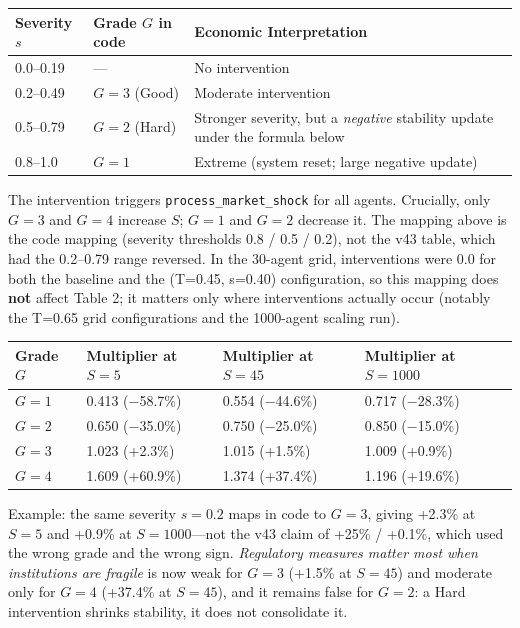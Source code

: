 \documentclass[11pt]{article}
\begin{document}
\begin{table}[htbp]
\centering
\begin{tabular}{lll}
\toprule
\textbf{Severity $s$} & \textbf{Grade $G$ in code} & \textbf{Economic Interpretation} \\
\midrule
0.0--0.19 & --- & No intervention \\
0.2--0.49 & $G=3$ (Good) & Moderate intervention \\
0.5--0.79 & $G=2$ (Hard) & Stronger severity, but a \textit{negative} stability update under the formula below \\
0.8--1.0 & $G=1$ & Extreme (system reset; large negative update) \\
\bottomrule
\end{tabular}
\end{table}

The intervention triggers \texttt{process\_market\_shock} for all agents. Crucially, only $G=3$ and $G=4$ increase $S$; $G=1$ and $G=2$ decrease it. The mapping above is the code mapping (severity thresholds 0.8 / 0.5 / 0.2), not the v43 table, which had the 0.2--0.79 range reversed. In the 30-agent grid, interventions were 0.0 for both the baseline and the (T=0.45, s=0.40) configuration, so this mapping does \textbf{not} affect Table 2; it matters only where interventions actually occur (notably the T=0.65 grid configurations and the 1000-agent scaling run).

\begin{table}[htbp]
\centering
\begin{tabular}{llll}
\toprule
\textbf{Grade $G$} & \textbf{Multiplier at $S=5$} & \textbf{Multiplier at $S=45$} & \textbf{Multiplier at $S=1000$} \\
\midrule
$G=1$ & 0.413 ($-$58.7\%) & 0.554 ($-$44.6\%) & 0.717 ($-$28.3\%) \\
$G=2$ & 0.650 ($-$35.0\%) & 0.750 ($-$25.0\%) & 0.850 ($-$15.0\%) \\
$G=3$ & 1.023 (+2.3\%) & 1.015 (+1.5\%) & 1.009 (+0.9\%) \\
$G=4$ & 1.609 (+60.9\%) & 1.374 (+37.4\%) & 1.196 (+19.6\%) \\
\bottomrule
\end{tabular}
\end{table}

Example: the same severity $s=0.2$ maps in code to $G=3$, giving +2.3\% at $S=5$ and +0.9\% at $S=1000$---not the v43 claim of +25\% / +0.1\%, which used the wrong grade and the wrong sign. \textit{Regulatory measures matter most when institutions are fragile} is now weak for $G=3$ (+1.5\% at $S=45$) and moderate only for $G=4$ (+37.4\% at $S=45$), and it remains false for $G=2$: a Hard intervention shrinks stability, it does not consolidate it.
\end{document}
